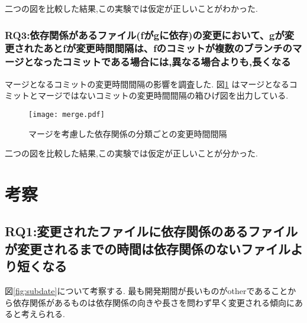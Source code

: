 \documentclass{fose2016}           %
\begin{document}
二つの図を比較した結果,この実験では仮定が正しいことがわかった.

\subsubsection*{RQ3:依存関係があるファイル(fがgに依存)の変更において、gが変更されたあとfが変更時間間隔は、fのコミットが複数のブランチのマージとなったコミットである場合には,異なる場合よりも,長くなる}
マージとなるコミットの変更時間間隔の影響を調査した.
図\ref{fig:merge_subdate} はマージとなるコミットとマージではないコミットの変更時間間隔の箱ひげ図を出力している.

\begin{figure}
\centering
\texttt{[image: merge.pdf]}
\caption{マージを考慮した依存関係の分類ごとの変更時間間隔}
\label{fig:merge_subdate} 
\end{figure}

二つの図を比較した結果,この実験では仮定が正しいことが分かった.

\section{考察}\label{考察}

\subsection{RQ1:変更されたファイルに依存関係のあるファイルが変更されるまでの時間は依存関係のないファイルより短くなる}
図\ref{fig:subdate}について考察する.
最も開発期間が長いものがotherであることから依存関係があるものは依存関係の向きや長さを問わず早く変更される傾向にあると考えられる.
\end{document}
